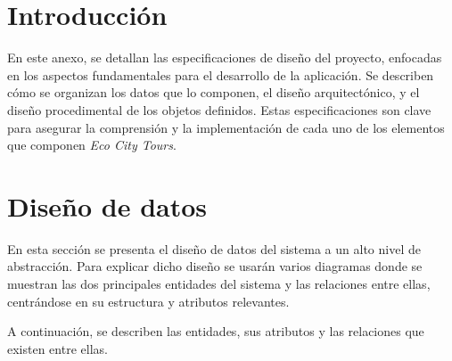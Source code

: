 
\section{Introducción}
En este anexo, se detallan las especificaciones de diseño del proyecto, enfocadas en los aspectos fundamentales para el desarrollo de la aplicación. Se describen cómo se organizan los datos que lo componen, el diseño arquitectónico, y el diseño procedimental de los objetos definidos. Estas especificaciones son clave para asegurar la comprensión y la implementación de cada uno de los elementos que componen \textit{Eco City Tours}.
\section{Diseño de datos}

En esta sección se presenta el diseño de datos del sistema a un alto nivel de abstracción. Para explicar dicho diseño se usarán varios diagramas donde se muestran las dos principales entidades del sistema y las relaciones entre ellas, centrándose en su estructura y atributos relevantes. 

A continuación, se describen las entidades, sus atributos y las relaciones que existen entre ellas.
